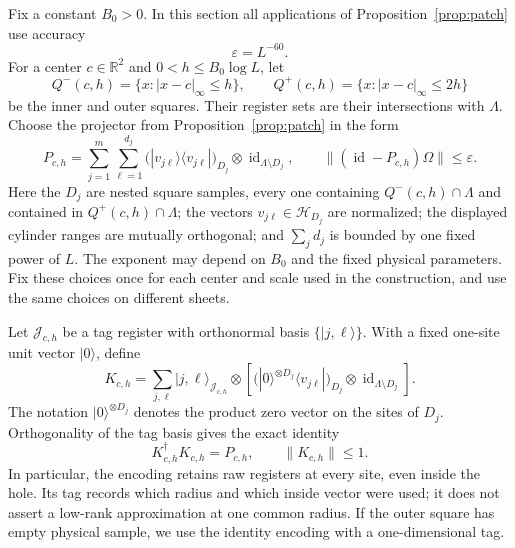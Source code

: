 \documentclass[11pt]{article}
\numberwithin{equation}{section}
\theoremstyle{definition}
\theoremstyle{remark}
\begin{document}
Fix a constant $B_0>0$.  In this section all applications of
Proposition~\ref{prop:patch} use accuracy
\begin{equation}\label{eq:frame-epsilon}
 \varepsilon=L^{-60}.
\end{equation}
For a center $c\in\mathbb R^2$ and $0<h\le B_0\log L$, let
\[
 Q^-(c,h)=\{x:\lvert x-c\rvert_\infty\le h\},\qquad
 Q^+(c,h)=\{x:\lvert x-c\rvert_\infty\le 2h\}
\]
be the inner and outer squares.  Their register sets are their intersections
with $\Lambda$.  Choose the projector from Proposition~\ref{prop:patch} in
the form
\begin{equation}\label{eq:hole-projector}
 P_{c,h}
   =\sum_{j=1}^{m}\sum_{\ell=1}^{d_j}
       \bigl(|v_{j\ell}\rangle\langle v_{j\ell}|\bigr)_{D_j}
           \otimes\operatorname{id}_{\Lambda\setminus D_j},
 \qquad
 \lVert (\operatorname{id}-P_{c,h})\Omega\rVert\le\varepsilon.
\end{equation}
Here the $D_j$ are nested square samples, every one containing
$Q^-(c,h)\cap\Lambda$ and contained in $Q^+(c,h)\cap\Lambda$; the vectors
$v_{j\ell}\in\mathcal H_{D_j}$ are normalized; the displayed cylinder
ranges are mutually orthogonal; and $\sum_jd_j$ is bounded by one fixed
power of $L$.  The exponent may depend on $B_0$ and the fixed physical
parameters.  Fix these choices once for each center and scale used in the
construction, and use the same choices on different sheets.

Let $\mathcal J_{c,h}$ be a tag register with orthonormal basis
$\{|j,\ell\rangle\}$.  With a fixed one-site unit vector $|0\rangle$, define
\begin{equation}\label{eq:hole-encoder}
 K_{c,h}
  =\sum_{j,\ell}|j,\ell\rangle_{\mathcal J_{c,h}}\otimes
       \left[
       \bigl(|0\rangle^{\otimes D_j}\langle v_{j\ell}|\bigr)_{D_j}
           \otimes\operatorname{id}_{\Lambda\setminus D_j}
       \right].
\end{equation}
The notation $|0\rangle^{\otimes D_j}$ denotes the product zero vector on
the sites of $D_j$.  Orthogonality of the tag basis gives the exact identity
\begin{equation}\label{eq:encoder-contraction}
 K_{c,h}^{\dagger}K_{c,h}=P_{c,h},\qquad \lVert K_{c,h}\rVert\le1.
\end{equation}
In particular, the encoding retains raw registers at every site, even inside
the hole.  Its tag records which radius and which inside vector were used;
it does not assert a low-rank approximation at one common radius.  If the
outer square has empty physical sample, we use the identity encoding with
a one-dimensional tag.
\end{document}
